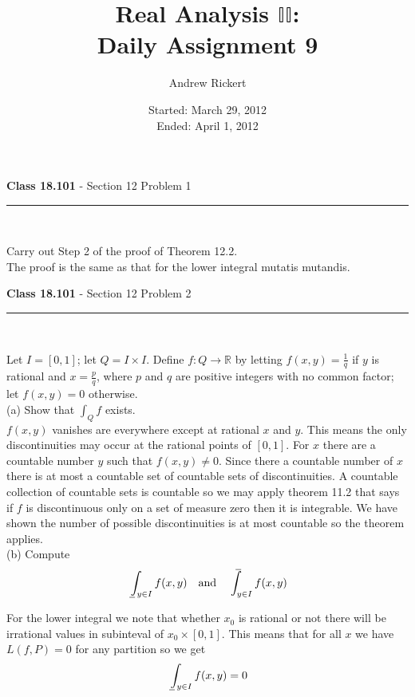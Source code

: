 \documentclass[11pt,reqno]{article}
\title{Real Analysis $\mathbb{II}$: \\ Daily Assignment 9}
\author{Andrew Rickert}
\date{Started: March 29, 2012 \\ \hspace{1pt} Ended: April 1,  2012}                                           %
\def\uint{\mathchoice%
    {\mkern13mu\overline{\vphantom{\intop}\mkern9mu}\mkern-20mu}%
    {\mkern9mu\overline{\vphantom{\intop}\mkern9mu}\mkern-14mu}%
    {\mkern9mu\overline{\vphantom{\intop}\mkern9mu}\mkern-14mu}%
    {\mkern9mu\overline{\vphantom{\intop}\mkern9mu}\mkern-14mu}%
  \int}
\def\lint{\mkern3mu\underline{\vphantom{\intop}\mkern9mu}\mkern-10mu\int}
\begin{document}
\maketitle


\begin{flushleft} 
\textbf{Class 18.101} - Section 12 Problem 1\\
\rule{500pt}{1pt}\\
\end{flushleft} 

\noindent Carry out Step 2 of the proof of Theorem 12.2.\\

The proof is the same as that for the lower integral mutatis mutandis.

\begin{flushleft} 
\textbf{Class 18.101} - Section 12 Problem 2\\
\rule{500pt}{1pt}\\
\end{flushleft} 

Let $I = [0,1]$; let $Q = I \times I$. Define $f : Q \to \mathbb{R}$ by letting $f(x,y) = \frac{1}{q}$ if $y$ is rational and $x = \frac{p}{q}$, where $p$ and $q$ are positive integers with no common factor; let $f(x,y) = 0$ otherwise.\\

\noindent (a) Show that $\int_Q f$ exists.\\

$f(x,y)$ vanishes are everywhere except at rational $x$ and $y$. This means the only discontinuities may occur at the rational points of $[0,1]$. For $x$ there are a countable number $y$ such that $f(x,y) \neq 0$. Since there a countable number of $x$ there is at most a countable set of countable sets of discontinuities. A countable collection of countable sets is countable so we may apply theorem 11.2 that says if $f$ is discontinuous only on a set of measure zero then it is integrable. We have shown the number of possible discontinuities is at most countable so the theorem applies.\\

\noindent (b) Compute
\[ \lint_{y \in I} f(x,y) \quad \text{and} \quad \uint_{y \in I} f(x,y)\]

For the lower integral we note that whether $x_0$ is rational or not there will be irrational values in subinteval of $x_0 \times [0,1]$. This means that for all $x$ we have $L(f,P) = 0$ for any partition so we get 
\[ \lint_{y \in I} f(x,y)  = 0 \]
\end{document}
